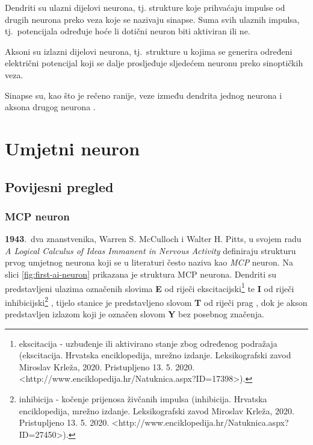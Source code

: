 \documentclass[times, utf8, zavrsni]{fer}
\begin{document}
Dendriti  su ulazni dijelovi neurona, tj. strukture koje prihvaćaju impulse od drugih neurona preko veza koje se nazivaju sinapse. Suma svih ulaznih impulsa, tj.\ potencijala određuje hoće li dotični neuron biti aktiviran ili ne.

Aksoni  su izlazni dijelovi neurona, tj.\ strukture u kojima se generira određeni električni potencijal koji se dalje prosljeđuje sljedećem neuronu preko sinoptičkih veza.

Sinapse  su, kao što je rečeno ranije, veze između dendrita jednog neurona i aksona drugog neurona \citep{bioNeuron}.

\section{Umjetni neuron}

\subsection{Povijesni pregled}

\subsubsection{MCP neuron}

\textbf{1943}.\ dva znanstvenika, Warren S. McCulloch i Walter H. Pitts, u svojem radu \textit{A Logical Calculus of Ideas Immanent in Nervous Activity} definiraju strukturu prvog umjetnog neurona koji se u literaturi često naziva kao \textit{MCP} neuron. Na slici \ref{fig:first-ai-neuron} prikazana je struktura MCP neurona. Dendriti su predstavljeni ulazima označenih slovima \textbf{E} od riječi ekscitacijski\footnote{ekscitacija - uzbuđenje ili aktivirano stanje zbog određenog podražaja (ekscitacija. Hrvatska enciklopedija, mrežno izdanje. Leksikografski zavod Miroslav Krleža, 2020. Pristupljeno 13. 5. 2020. <http://www.enciklopedija.hr/Natuknica.aspx?ID=17398>).}  te \textbf{I} od riječi inhibicijski\footnote{inhibicija - kočenje prijenosa živčanih impulsa (inhibicija. Hrvatska enciklopedija, mrežno izdanje. Leksikografski zavod Miroslav Krleža, 2020. Pristupljeno 13. 5. 2020. <http://www.enciklopedija.hr/Natuknica.aspx?ID=27450>).} , tijelo stanice je predstavljeno slovom \textbf{T} od riječi prag , dok je akson predstavljen izlazom koji je označen slovom \textbf{Y} bez posebnog značenja.
\end{document}
